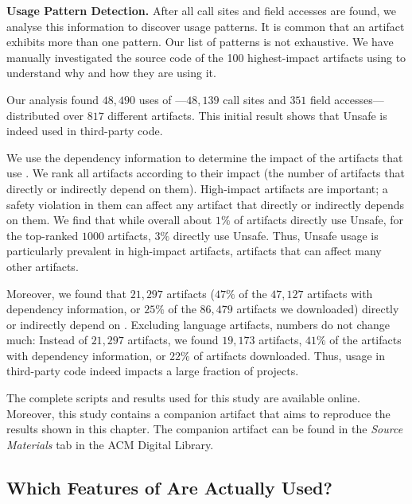 \textbf{Usage Pattern Detection.}
After all call sites and field accesses are found,
we analyse this information to discover usage patterns.
It is common that an artifact exhibits more than one pattern.
Our list of patterns is not exhaustive.
We have manually investigated the source code of the 100 highest-impact artifacts using  to understand why and how they are using it.

Our analysis found $48,490$ uses of ---$48,139$ call sites and $351$ field accesses---distributed over $817$ different artifacts.
This initial result shows that Unsafe is indeed used in third-party code.

We use the dependency information to determine the impact of the artifacts that use .
We rank all artifacts according to their impact (the number of artifacts that directly or indirectly depend on them).
High-impact artifacts are important;
a safety violation in them can affect any artifact that directly or indirectly depends on them.
We find that while overall about $1\%$ of artifacts directly use Unsafe,
for the top-ranked $1000$ artifacts, $3\%$ directly use Unsafe.
Thus, Unsafe usage is particularly prevalent in high-impact artifacts, artifacts that can affect many other artifacts.

Moreover, we found that $21,297$ artifacts ($47\%$ of the $47,127$ artifacts with dependency information, or $25\%$ of the $86,479$ artifacts we downloaded) directly or indirectly depend on .
Excluding language artifacts, numbers do not change much:
Instead of $21,297$ artifacts, we found $19,173$ artifacts,
$41\%$ of the artifacts with dependency information, or $22\%$ of artifacts downloaded.
Thus,  usage in third-party code indeed impacts a large fraction of projects.

The complete scripts and results used for this study are available online.%
Moreover, this study contains a companion artifact that aims to reproduce the results shown in this chapter.
The companion artifact can be found in the \emph{Source Materials} tab in the ACM Digital Library.%


\subsection*{Which Features of \unsafe{} Are Actually Used?}

